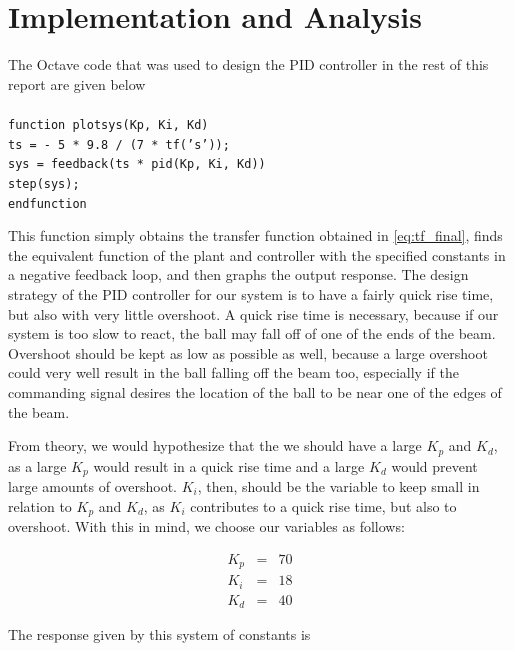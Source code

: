 \documentclass[a4paper, 12pt]{article}
\begin{document}

\section{Implementation and Analysis}
	The Octave code that was used to design the PID controller in the rest of
	this report are given below\\\\\noindent
	\texttt{function plotsys(Kp, Ki, Kd)\\\noindent
  ts = - 5 * 9.8 / (7 * tf('s'));\\\noindent
  sys = feedback(ts * pid(Kp, Ki, Kd))\\\noindent
  step(sys);\\\noindent
endfunction}

This function simply obtains the transfer function obtained in
\eqref{eq:tf_final}, finds the equivalent function of the plant and controller
with the specified constants in a negative feedback loop, and then graphs the
output response. The design strategy of the PID controller for our system is to
have a fairly quick rise time, but also with very little overshoot. A quick
rise time is necessary, because if our system is too slow to react, the ball
may fall off of one of the ends of the beam. Overshoot should be kept as low as
possible as well, because a large overshoot could very well result in the ball
falling off the beam too, especially if the commanding signal desires the
location of the ball to be near one of the edges of the beam.

From theory, we would hypothesize that the we should have a large $K_p$ and
$K_d$, as a large $K_p$ would result in a quick rise time and a large $K_d$
would prevent large amounts of overshoot. $K_i$, then, should be the variable
to keep small in relation to $K_p$ and $K_d$, as $K_i$ contributes to a quick
rise time, but also to overshoot. With this in mind, we choose our variables as follows:

\begin{equation}
  \begin{array}{rcl}
	K_p & = & 70 \\
	K_i & = & 18 \\
	K_d & = & 40
  \end{array}
  \label{eq:pid_constants}
\end{equation}

The response given by this system of constants is
\end{document}
